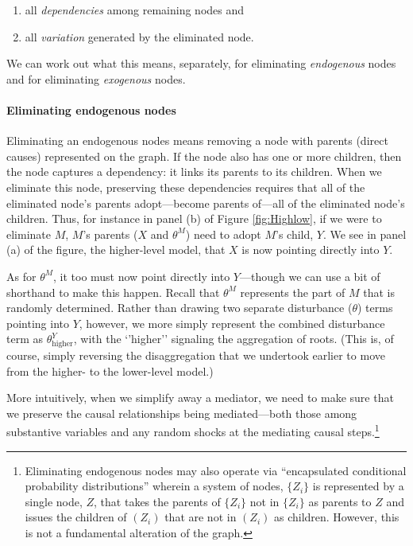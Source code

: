 \documentclass[12pt,]{book}
\providecommand{\tightlist}{%
  \setlength{\itemsep}{0pt}\setlength{\parskip}{0pt}}
\let\oldparagraph\paragraph
\renewcommand{\paragraph}[1]{\oldparagraph{#1}\mbox{}}
\let\rmarkdownfootnote\footnote%
\def\footnote{\protect\rmarkdownfootnote}
\begin{document}
\begin{enumerate}
\def\labelenumi{(\alph{enumi})}
\tightlist
\item
  all \emph{dependencies} among remaining nodes and
\item
  all \emph{variation} generated by the eliminated node.
\end{enumerate}

We can work out what this means, separately, for eliminating \emph{endogenous} nodes and for eliminating \emph{exogenous} nodes.

\hypertarget{eliminating-endogenous-nodes}{%
\paragraph{Eliminating endogenous nodes}\label{eliminating-endogenous-nodes}}

Eliminating an endogenous nodes means removing a node with parents (direct causes) represented on the graph. If the node also has one or more children, then the node captures a dependency: it links its parents to its children. When we eliminate this node, preserving these dependencies requires that all of the eliminated node's parents adopt---become parents of---all of the eliminated node's children. Thus, for instance in panel (b) of Figure \ref{fig:Highlow}, if we were to eliminate \(M\), \(M\)'s parents (\(X\) and \(\theta^M\)) need to adopt \(M\)'s child, \(Y\). We see in panel (a) of the figure, the higher-level model, that \(X\) is now pointing directly into \(Y\).

As for \(\theta^M\), it too must now point directly into \(Y\)---though we can use a bit of shorthand to make this happen. Recall that \(\theta^M\) represents the part of \(M\) that is randomly determined. Rather than drawing two separate disturbance (\(\theta\)) terms pointing into \(Y\), however, we more simply represent the combined disturbance term as \(\theta^Y_{\text{higher}}\), with the `'higher'' signaling the aggregation of roots. (This is, of course, simply reversing the disaggregation that we undertook earlier to move from the higher- to the lower-level model.)

More intuitively, when we simplify away a mediator, we need to make sure that we preserve the causal relationships being mediated---both those among substantive variables and any random shocks at the mediating causal steps.\footnote{Eliminating endogenous nodes may also operate via ``encapsulated conditional probability distributions'' \citep{koller2009probabilistic} wherein a system of nodes, \(\{Z_i\}\) is represented by a single node, \(Z\), that takes the parents of \(\{Z_i\}\) not in \(\{Z_i\}\) as parents to \(Z\) and issues the children of \((Z_i)\) that are not in \((Z_i)\) as children. However, this is not a fundamental alteration of the graph.}
\end{document}
